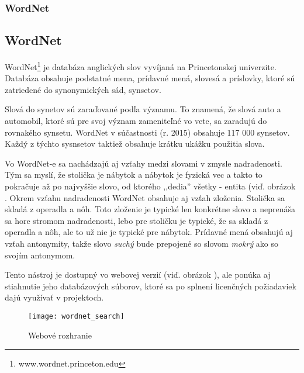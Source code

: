 %
%
{
	\subsubsection{WordNet}
}
{
	\subsection{WordNet}
}
\label{subsubsec:wordnet}
WordNet\footnote{www.wordnet.princeton.edu} je databáza anglických slov vyvíjaná na Princetonskej univerzite. Databáza obsahuje podstatné mena, prídavné mená, slovesá a príslovky, ktoré sú zatriedené do synonymických sád, synsetov.

Slová do synetov sú zaraďované podľa významu. To znamená, že slová auto a automobil, ktoré sú pre svoj význam zameniteľné vo vete, sa zaradujú do rovnakého synsetu. WordNet v súčastnosti (r. 2015) obsahuje 117 000 synsetov. Každý z týchto sysnsetov taktiež obsahuje krátku ukážku použitia slova.

Vo WordNet-e sa nachádzajú aj vzťahy medzi slovami v zmysle nadradenosti. Tým sa myslí, že stolička je nábytok a nábytok je fyzická vec a takto to pokračuje až po najvyššie slovo, od ktorého ,,dedia'' všetky - entita (viď. obrázok . Okrem vzťahu nadradenosti WordNet obsahuje aj vzťah zloženia. Stolička sa skladá z operadla a nôh. Toto zloženie je typické len konkrétne slovo a neprenáša sa hore stromom nadradenosti,   lebo pre stoličku je typické, že sa skladá z operadla a nôh, ale to už nie je typické pre nábytok.
Prídavné mená obsahujú aj vzťah antonymity, takže slovo \textit{suchý} bude prepojené so slovom \textit{mokrý} ako so svojím antonymom.

Tento nástroj je dostupný vo webovej verzií (viď. obrázok ), ale ponúka aj stiahnutie jeho databázových súborov, ktoré sa po splnení licenčných požiadaviek dajú využívať v projektoch.

\begin{figure}[H]
\begin{center}\texttt{[image: wordnet\_search]}\end{center}
\caption[Webové rozhranie]{Webové rozhranie}\label{fig:wordnet_search}
\end{figure}

